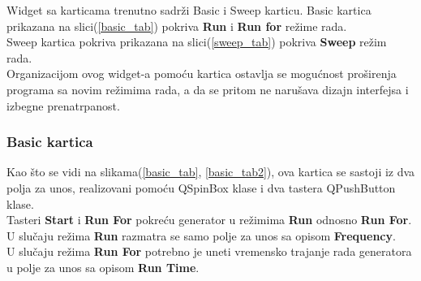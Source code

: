Widget sa karticama trenutno sadrži Basic i Sweep karticu. Basic kartica
prikazana na slici(\ref{basic_tab}) pokriva
\textbf{Run} i \textbf{Run for} režime rada. \\
Sweep kartica pokriva prikazana na slici(\ref{sweep_tab}) pokriva \textbf{Sweep}
režim rada. \\

Organizacijom ovog widget-a pomoću kartica ostavlja se mogućnost proširenja programa
sa novim režimima rada, a da se pritom ne narušava dizajn interfejsa i izbegne
prenatrpanost. \\


\subsubsection{Basic kartica}

Kao što se vidi na slikama(\ref{basic_tab}, \ref{basic_tab2}), ova kartica se
sastoji iz dva polja za unos, realizovani pomoću QSpinBox\cite{QSpinBox} klase i
dva tastera QPushButton\cite{QPushButton} klase. \\

Tasteri \textbf{Start} i \textbf{Run For} pokreću generator u režimima \textbf{Run} odnosno \textbf{Run For}. \\
U slučaju režima \textbf{Run} razmatra se samo polje za unos sa opisom
\textbf{Frequency}. \\
U slučaju režima \textbf{Run For} potrebno je uneti vremensko trajanje rada generatora u
polje za unos sa opisom \textbf{Run Time}. \\
\begin{figure}[H]
\end{figure}

\begin{figure}[H]
\end{figure}

